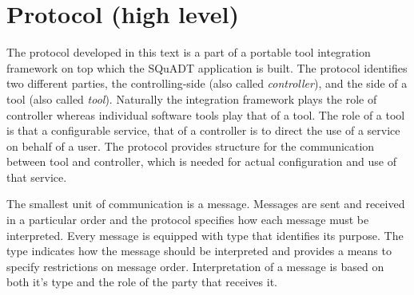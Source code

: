 \documentclass{article}
\newcommand{\squadt}{SQuADT\xspace}
\begin{document}
%
%   
%

 \section{Protocol (high level)} \label{s:message_definitions}

  The protocol developed in this text is a part of a portable tool integration
  framework on top which the \squadt application is built. The protocol
  identifies two different parties, the controlling-side (also called
  \textit{controller}), and the side of a tool (also called \textit{tool}).
  Naturally the integration framework plays the role of controller whereas
  individual software tools play that of a tool.  The role of a tool is that a
  configurable service, that of a controller is to direct the use of a service
  on behalf of a user. The protocol provides structure for the communication
  between tool and controller, which is needed for actual configuration and use
  of that service.

  The smallest unit of communication is a message. Messages are sent and
  received in a particular order and the protocol specifies how each message
  must be interpreted. Every message is equipped with type that identifies its
  purpose.  The type indicates how the message should be interpreted and
  provides a means to specify restrictions on message order. Interpretation of
  a message is based on both it's type and the role of the party that receives
  it.
\end{document}
